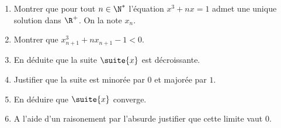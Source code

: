 




\begin{exercice}
\begin{enumerate}
\item Montrer que pour tout $n\in \N^*$ l'équation $x^3+nx=1$ admet une unique solution dans $\R^+$. On la note $x_n$. 
\item Montrer que $x_{n+1}^3+n x_{n+1}-1<0$.
\item En déduite que la suite $\suite{x} $ est décroissante. 
\item Justifier que la suite est minorée par $0$ et majorée par $1$. 
\item En déduire que $\suite{x}$ converge. 
\item A l'aide d'un raisonement par l'absurde justifier que cette limite vaut $0$. 
\end{enumerate}
\end{exercice}

